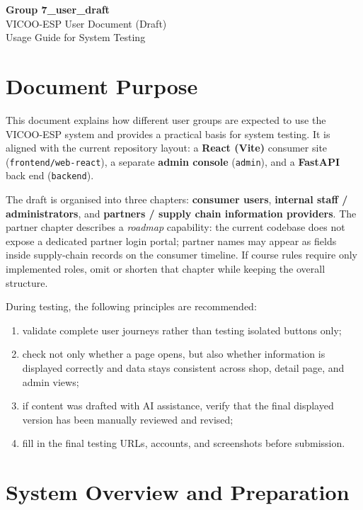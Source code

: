 \documentclass[11pt]{article}
\newcommand{\projectname}{VICOO-ESP}
\begin{document}
\begin{center}
{\LARGE \textbf{Group 7\_user\_draft}}\\[0.5em]
{\large \projectname{} User Document (Draft)}\\[0.5em]
Usage Guide for System Testing\\
\end{center}

\section*{Document Purpose}
This document explains how different user groups are expected to use the \projectname{} system and provides a practical basis for system testing. It is aligned with the current repository layout: a \textbf{React (Vite)} consumer site (\texttt{frontend/web-react}), a separate \textbf{admin console} (\texttt{admin}), and a \textbf{FastAPI} back end (\texttt{backend}).

The draft is organised into three chapters: \textbf{consumer users}, \textbf{internal staff / administrators}, and \textbf{partners / supply chain information providers}. The partner chapter describes a \emph{roadmap} capability: the current codebase does not expose a dedicated partner login portal; partner names may appear as fields inside supply-chain records on the consumer timeline. If course rules require only implemented roles, omit or shorten that chapter while keeping the overall structure.

During testing, the following principles are recommended:
\begin{enumerate}[leftmargin=2.2em]
    \item validate complete user journeys rather than testing isolated buttons only;
    \item check not only whether a page opens, but also whether information is displayed correctly and data stays consistent across shop, detail page, and admin views;
    \item if content was drafted with AI assistance, verify that the final displayed version has been manually reviewed and revised;
    \item fill in the final testing URLs, accounts, and screenshots before submission.
\end{enumerate}

\tableofcontents

\section{System Overview and Preparation}
\end{document}
